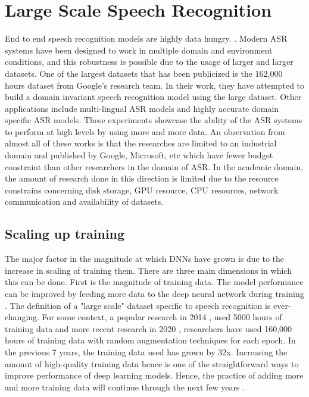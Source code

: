 \chapter{Large Scale Speech Recognition}
\label{chapter:largescale}

End to end speech recognition models are highly data hungry. \cite{Li2020OnRecognition}. Modern ASR systems have been designed to work in multiple domain and environment conditions, and this robustness is possible due to the usage of larger and larger datasets. One of the largest datasets that has been publicized is the 162,000 hours dataset from Google's research team. In their work, they have attempted to build a domain invariant speech recognition model using the large dataset\cite{Narayanan2019TowardTraining}. Other applications include multi-lingual ASR models \cite{Kannan2019Large-ScaleModel} and highly accurate domain specific ASR models. These experiments showcase the ability of the ASR systems to perform at high levels by using more and more data. An observation from almost all of these works is that the researches are limited to an industrial domain and published by Google, Microsoft, etc which have fewer budget constraint than other researchers in the domain of ASR. In the academic domain, the amount of research done in this direction is limited due to the resource constrains concerning disk storage, GPU resource, CPU resources, network communication and availability of datasets. 

\section{Scaling up training}
The major factor in the magnitude at which DNNs have grown is due to the increase in scaling of training them. There are three main dimensions in which this can be done. First is the magnitude of training data. The model performance can be improved by feeding more data to the deep neural network during training \cite{HestnessDEEPEMPIRICALLY}. The definition of a "large scale" dataset specific to speech recognition is ever-changing. For some context, a popular research in 2014 \cite{Hannun2014DeepRecognition}, used 5000 hours of training data and more recent research in 2020 \cite{Li2020OnRecognition}, researchers have used 160,000 hours of training data with random augmentation techniques for each epoch. In the previous 7 years, the training data used has grown by 32x. Increasing the amount of high-quality training data hence is one of the straightforward ways to improve performance of deep learning models. Hence, the practice of adding more and more training data will continue through the next few years \cite{MayerRuben2020ScalableInfrastructures}. 

